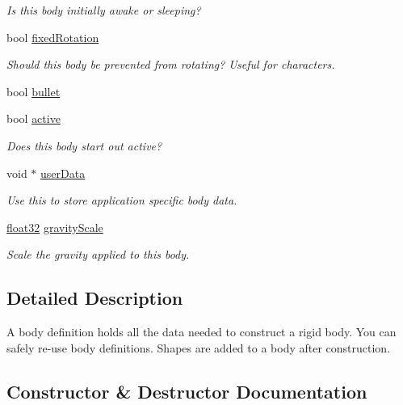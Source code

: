 \begin{DoxyCompactItemize}
\begin{DoxyCompactList}\small\item\em Is this body initially awake or sleeping? \end{DoxyCompactList}\item 
bool \mbox{\hyperlink{structb2_body_def_a273a51c57440a8884de5939d76b6e3ea}{fixed\+Rotation}}
\begin{DoxyCompactList}\small\item\em Should this body be prevented from rotating? Useful for characters. \end{DoxyCompactList}\item 
bool \mbox{\hyperlink{structb2_body_def_a7c0047c9a98a1d20614eeddcdbce7586}{bullet}}
\item 
bool \mbox{\hyperlink{structb2_body_def_adf6f3e9a9e124e080c68bc0edeb170df}{active}}
\begin{DoxyCompactList}\small\item\em Does this body start out active? \end{DoxyCompactList}\item 
void $\ast$ \mbox{\hyperlink{structb2_body_def_ae457dd1d39be09945eace6061121be29}{user\+Data}}
\begin{DoxyCompactList}\small\item\em Use this to store application specific body data. \end{DoxyCompactList}\item 
\mbox{\hyperlink{b2_settings_8h_aacdc525d6f7bddb3ae95d5c311bd06a1}{float32}} \mbox{\hyperlink{structb2_body_def_aadea3fa173ed1014739ec8b023de4336}{gravity\+Scale}}
\begin{DoxyCompactList}\small\item\em Scale the gravity applied to this body. \end{DoxyCompactList}\end{DoxyCompactItemize}


\subsection{Detailed Description}
A body definition holds all the data needed to construct a rigid body. You can safely re-\/use body definitions. Shapes are added to a body after construction. 

\subsection{Constructor \& Destructor Documentation}
\mbox{\label{structb2_body_def_a87bee47596b3b3eced0d9dd1f4c18fee}} 
